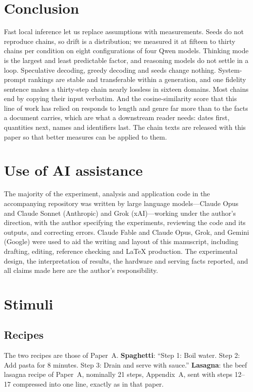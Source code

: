 \documentclass[11pt]{article}
\begin{document}
\section{Conclusion}
\label{sec:conclusion}

Fast local inference let us replace assumptions with measurements. Seeds do
not reproduce chains, so drift is a distribution; we measured it at fifteen
to thirty chains per condition on eight configurations of four Qwen models.
Thinking mode is the largest and least predictable factor, and reasoning
models do not settle in a loop. Speculative decoding, greedy decoding and
seeds change nothing. System-prompt rankings are stable and transferable
within a generation, and one fidelity sentence makes a thirty-step chain
nearly lossless in sixteen domains. Most chains end by copying their input
verbatim. And the cosine-similarity score that this line of work has relied
on responds to length and genre far more than to the facts a document
carries, which are what a downstream reader needs: dates first, quantities
next, names and identifiers last. The chain texts are released with this
paper so that better measures can be applied to them.

\section*{Use of AI assistance}
\label{sec:ai-disclosure}
The majority of the experiment, analysis and application code in the
accompanying repository was written by large language models---Claude Opus
and Claude Sonnet (Anthropic) and Grok (xAI)---working under the author's
direction, with the author specifying the experiments, reviewing the code
and its outputs, and correcting errors. Claude Fable and Claude Opus, Grok,
and Gemini (Google) were used to aid the writing and layout of this
manuscript, including drafting, editing, reference checking and LaTeX
production. The experimental design, the interpretation of results, the
hardware and serving facts reported, and all claims made here are the
author's responsibility.




\clearpage
\appendix

\section{Stimuli}
\label{app:prompts}

\subsection{Recipes}
The two recipes are those of Paper~A. \textbf{Spaghetti}: ``Step 1: Boil
water. Step 2: Add pasta for 8 minutes. Step 3: Drain and serve with
sauce.'' \textbf{Lasagna}: the beef lasagna recipe of Paper~A, nominally 21 steps,
Appendix~A, sent with steps 12--17 compressed into one line, exactly as in
that paper.
\end{document}
